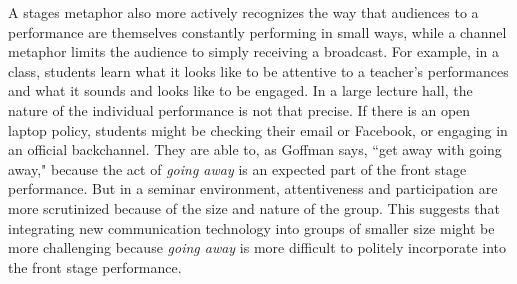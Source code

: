 

A stages metaphor also more actively recognizes the way that audiences to a performance are themselves constantly performing in small ways, while a channel metaphor limits the audience to simply receiving a broadcast. For example, in a class, students learn what it looks like to be attentive to a teacher's performances and what it sounds and looks like to be engaged. In a large lecture hall, the nature of the individual performance is not that precise. If there is an open laptop policy, students might be checking their email or Facebook, or engaging in an official backchannel.  They are able to, as Goffman says, ``get away with going away," because the act of \emph{going away} is an expected part of the front stage performance. But in a seminar environment, attentiveness and participation are more scrutinized because of the size and nature of the group. This suggests that integrating new communication technology into groups of smaller size might be more challenging because \emph{going away} is more difficult to politely incorporate into the front stage performance.  


